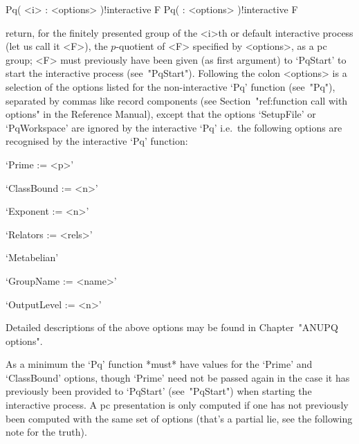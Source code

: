 \>Pq( <i> : <options> )!{interactive} F
\>Pq( : <options> )!{interactive} F

return, for  the  finitely  presented  group  of  the  <i>th  or  default
interactive {\ANUPQ} process (let us call it <F>),  the  $p$-quotient  of
<F> specified by <options>, as a pc group; <F> must previously have  been
given (as first argument) to `PqStart' to start the interactive  {\ANUPQ}
process (see~"PqStart"). Following the colon <options> is a selection  of
the options listed for  the  non-interactive  `Pq'  function  (see~"Pq"),
separated by commas like  record  components  (see  Section~"ref:function
call with options" in the  {\GAP}  Reference  Manual),  except  that  the
options `SetupFile' or `PqWorkspace' are ignored by the interactive  `Pq'
i.e.~the  following  options  are  recognised  by  the  interactive  `Pq'
function:

\beginlist

\item{}`Prime := <p>'

\item{}`ClassBound := <n>'

\item{}`Exponent := <n>'

\item{}`Relators := <rels>'

\item{}`Metabelian'

\item{}`GroupName := <name>'

\item{}`OutputLevel := <n>'

\endlist

Detailed descriptions of the above options may be found in Chapter~"ANUPQ
options".

As a minimum the `Pq' function *must* have values  for  the  `Prime'  and
`ClassBound' options, though `Prime' need not be passed again in the case
it  has  previously  been  provided  to  `PqStart'  (see~"PqStart")  when
starting the interactive process. A pc presentation is only  computed  if
one has not previously been computed with the same set of options (that's
a partial lie, see the following note for the truth).

